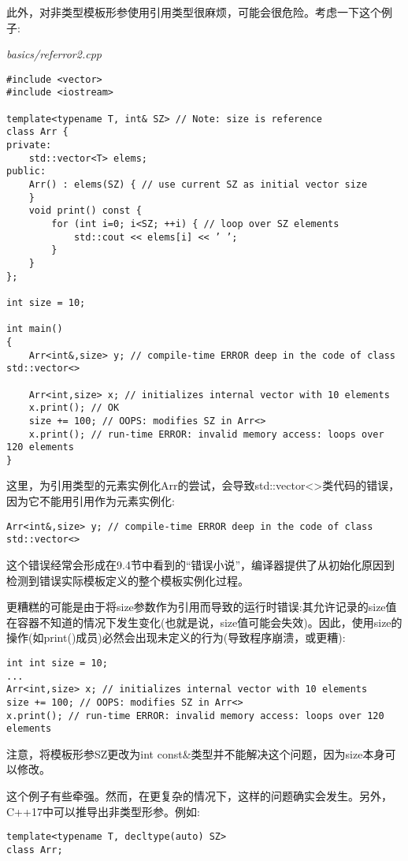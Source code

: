 此外，对非类型模板形参使用引用类型很麻烦，可能会很危险。考虑一下这个例子:

\noindent
\textit{basics/referror2.cpp}
\begin{lstlisting}[style=styleCXX]
#include <vector>
#include <iostream>

template<typename T, int& SZ> // Note: size is reference
class Arr {
private:
	std::vector<T> elems;
public:
	Arr() : elems(SZ) { // use current SZ as initial vector size
	}
	void print() const {
		for (int i=0; i<SZ; ++i) { // loop over SZ elements
			std::cout << elems[i] << ’ ’;
		}
	}
};

int size = 10;

int main()
{
	Arr<int&,size> y; // compile-time ERROR deep in the code of class std::vector<>
	
	Arr<int,size> x; // initializes internal vector with 10 elements
	x.print(); // OK
	size += 100; // OOPS: modifies SZ in Arr<>
	x.print(); // run-time ERROR: invalid memory access: loops over 120 elements
}
\end{lstlisting}

这里，为引用类型的元素实例化Arr的尝试，会导致std::vector<>类代码的错误，因为它不能用引用作为元素实例化:

\begin{lstlisting}[style=styleCXX]
Arr<int&,size> y; // compile-time ERROR deep in the code of class std::vector<>
\end{lstlisting}

这个错误经常会形成在9.4节中看到的“错误小说”，编译器提供了从初始化原因到检测到错误实际模板定义的整个模板实例化过程。

更糟糕的可能是由于将size参数作为引用而导致的运行时错误:其允许记录的size值在容器不知道的情况下发生变化(也就是说，size值可能会失效)。因此，使用size的操作(如print()成员)必然会出现未定义的行为(导致程序崩溃，或更糟):

\begin{lstlisting}[style=styleCXX]
int int size = 10;
...
Arr<int,size> x; // initializes internal vector with 10 elements
size += 100; // OOPS: modifies SZ in Arr<>
x.print(); // run-time ERROR: invalid memory access: loops over 120 elements
\end{lstlisting}

注意，将模板形参SZ更改为int const\&类型并不能解决这个问题，因为size本身可以修改。

这个例子有些牵强。然而，在更复杂的情况下，这样的问题确实会发生。另外，C++17中可以推导出非类型形参。例如:

\begin{lstlisting}[style=styleCXX]
template<typename T, decltype(auto) SZ>
class Arr;
\end{lstlisting}

